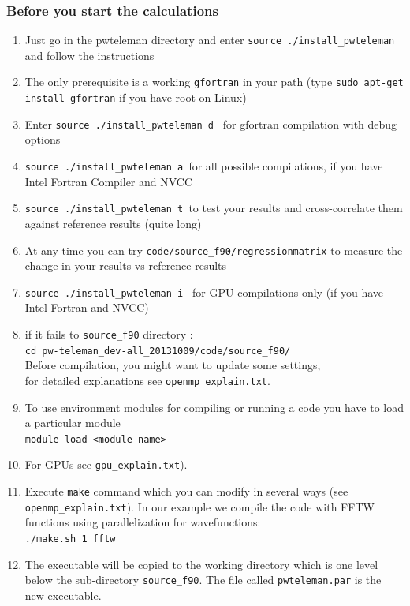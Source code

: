 \documentclass[10pt]{beamer}
\begin{document}
\begin{frame}
\frametitle{Before you start the calculations}
\begin{enumerate}  
\item Just go in the pwteleman directory and enter {\tt source ./install_pwteleman} and follow the instructions
\item The only prerequisite is a working {\tt gfortran} in your path (type  {\tt sudo apt-get install gfortran} if you have root on Linux)
\item Enter {\tt source ./install_pwteleman d } for gfortran compilation with debug options 
\item  {\tt source ./install_pwteleman a }for all possible compilations, if you have Intel Fortran Compiler and NVCC 

\item   {\tt source ./install_pwteleman t }to test your results and cross-correlate them against reference results  (quite long) 
\item  At any time you can try {\tt code/source_f90/regressionmatrix} to measure the change in your results vs reference results 
\item   {\tt source ./install_pwteleman i } for GPU compilations only (if you have Intel Fortran and NVCC) 
\item if it fails  to {\tt source\_f90} directory :\\
\vspace*{0.2cm}
{\tt cd pw-teleman\_dev-all\_20131009/code/source\_f90/
}\\
\vspace*{0.2cm}
Before compilation, you might want to update some settings,\\ for detailed explanations see {\tt openmp\_explain.txt}.
\vspace*{0.2cm}
\item To use environment modules for compiling or running a code you have to load a particular module\\
\vspace*{0.2cm}
{\tt module load <module name>}
\vspace*{0.2cm}
\item For GPUs see {\tt gpu\_explain.txt}).
\item Execute {\tt make} command which you can modify in several ways (see {\tt openmp\_explain.txt}). In our example we compile the code with FFTW functions using parallelization for wavefunctions:\\
\vspace*{0.2cm}
\vspace*{0.2cm}
{\tt ./make.sh 1 fftw} 
\vspace*{0.2cm}
\item The executable will be copied to the working
 directory which is one level below the sub-directory {\tt source\_f90}. The file called {\tt pwteleman.par} is
 the new executable.
\end{enumerate} 
 

   
\end{frame}
\end{document}
